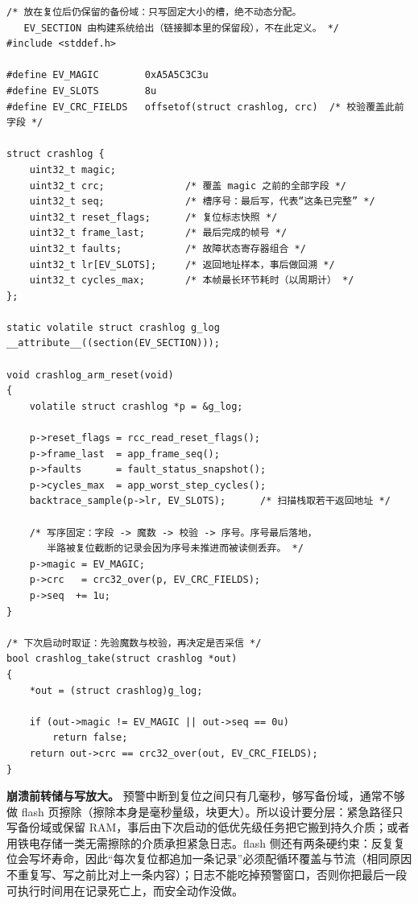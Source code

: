 \documentclass[12pt,a4paper,fontset=fandol]{ctexbook}
\begin{document}
\begin{lstlisting}[style=cstyle,caption={C：备份 RAM 里的一槽崩溃证据（固定大小、循环覆盖、不做分配）},label={lst:ch04-bkram}]
/* 放在复位后仍保留的备份域：只写固定大小的槽，绝不动态分配。
   EV_SECTION 由构建系统给出（链接脚本里的保留段），不在此定义。 */
#include <stddef.h>

#define EV_MAGIC        0xA5A5C3C3u
#define EV_SLOTS        8u
#define EV_CRC_FIELDS   offsetof(struct crashlog, crc)  /* 校验覆盖此前字段 */

struct crashlog {
    uint32_t magic;
    uint32_t crc;              /* 覆盖 magic 之前的全部字段 */
    uint32_t seq;              /* 槽序号：最后写，代表“这条已完整” */
    uint32_t reset_flags;      /* 复位标志快照 */
    uint32_t frame_last;       /* 最后完成的帧号 */
    uint32_t faults;           /* 故障状态寄存器组合 */
    uint32_t lr[EV_SLOTS];     /* 返回地址样本，事后做回溯 */
    uint32_t cycles_max;       /* 本帧最长环节耗时（以周期计） */
};

static volatile struct crashlog g_log __attribute__((section(EV_SECTION)));

void crashlog_arm_reset(void)
{
    volatile struct crashlog *p = &g_log;

    p->reset_flags = rcc_read_reset_flags();
    p->frame_last  = app_frame_seq();
    p->faults      = fault_status_snapshot();
    p->cycles_max  = app_worst_step_cycles();
    backtrace_sample(p->lr, EV_SLOTS);      /* 扫描栈取若干返回地址 */

    /* 写序固定：字段 -> 魔数 -> 校验 -> 序号。序号最后落地，
       半路被复位截断的记录会因为序号未推进而被读侧丢弃。 */
    p->magic = EV_MAGIC;
    p->crc   = crc32_over(p, EV_CRC_FIELDS);
    p->seq  += 1u;
}

/* 下次启动时取证：先验魔数与校验，再决定是否采信 */
bool crashlog_take(struct crashlog *out)
{
    *out = (struct crashlog)g_log;

    if (out->magic != EV_MAGIC || out->seq == 0u)
        return false;
    return out->crc == crc32_over(out, EV_CRC_FIELDS);
}
\end{lstlisting}

\textbf{崩溃前转储与写放大。} 预警中断到复位之间只有几毫秒，够写备份域，通常不够做 flash 页擦除（擦除本身是毫秒量级，块更大）。所以设计要分层：紧急路径只写备份域或保留 RAM，事后由下次启动的低优先级任务把它搬到持久介质；或者用铁电存储一类无需擦除的介质承担紧急日志。flash 侧还有两条硬约束：反复复位会写坏寿命，因此``每次复位都追加一条记录''必须配循环覆盖与节流（相同原因不重复写、写之前比对上一条内容）；日志不能吃掉预警窗口，否则你把最后一段可执行时间用在记录死亡上，而安全动作没做。
\end{document}
